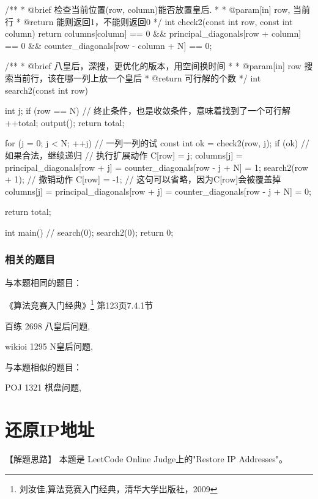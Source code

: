 \begin{Codex}[label=eight_queen.c]
/**
 * @brief 检查当前位置(row, column)能否放置皇后.
 *
 * @param[in] row, 当前行
 * @return 能则返回1，不能则返回0
 */
int check2(const int row, const int column) {
    return columns[column] == 0 && principal_diagonals[row + column] == 0
        && counter_diagonals[row - column + N] == 0;
}

/**
 * @brief 八皇后，深搜，更优化的版本，用空间换时间
 *
 * @param[in] row 搜索当前行，该在哪一列上放一个皇后
 * @return 可行解的个数
 */
int search2(const int row) {
    int j;
    if (row == N) { // 终止条件，也是收敛条件，意味着找到了一个可行解
        ++total;
        output();
        return total;
    }

    for (j = 0; j < N; ++j) {  // 一列一列的试
        const int ok = check2(row, j);
        if (ok) {  // 如果合法，继续递归
            // 执行扩展动作
            C[row] = j;
            columns[j] = principal_diagonals[row + j] =
                    counter_diagonals[row - j + N] = 1;
            search2(row + 1);
            // 撤销动作
            C[row] = -1;  // 这句可以省略，因为C[row]会被覆盖掉
            columns[j] = principal_diagonals[row + j] =
                    counter_diagonals[row - j + N] = 0;
        }
    }

    return total;
}

int main() {
    // search(0);
    search2(0);
    return 0;
}
\end{Codex}

\subsubsection{相关的题目}
与本题相同的题目：
\begindot
\item 《算法竞赛入门经典》\footnote{刘汝佳,算法竞赛入门经典，清华大学出版社，2009} 第123页7.4.1节
\item 百练 2698 八皇后问题, 
\item wikioi 1295 N皇后问题, 
\myenddot

与本题相似的题目：
\begindot
\item POJ 1321 棋盘问题, 
\myenddot


\section{还原IP地址} %

【解题思路】
本题是 LeetCode Online Judge上的"Restore IP Addresses"。

